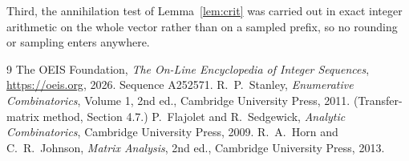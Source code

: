 \documentclass[11pt,a4paper]{article}
\theoremstyle{plain}
\theoremstyle{definition}
\begin{document}
Third, the annihilation test of Lemma~\ref{lem:crit} was carried out in exact integer
arithmetic on the whole vector rather than on a sampled prefix, so no rounding or sampling
enters anywhere.

\begin{thebibliography}{9}
 The OEIS Foundation, \emph{The On-Line Encyclopedia of Integer
Sequences}, \url{https://oeis.org}, 2026. Sequence A252571.
 R.~P.~Stanley, \emph{Enumerative Combinatorics}, Volume 1, 2nd ed.,
Cambridge University Press, 2011. (Transfer-matrix method, Section 4.7.)
 P.~Flajolet and R.~Sedgewick, \emph{Analytic Combinatorics}, Cambridge
University Press, 2009.
 R.~A.~Horn and C.~R.~Johnson, \emph{Matrix Analysis}, 2nd ed., Cambridge
University Press, 2013.
\end{thebibliography}
\end{document}
